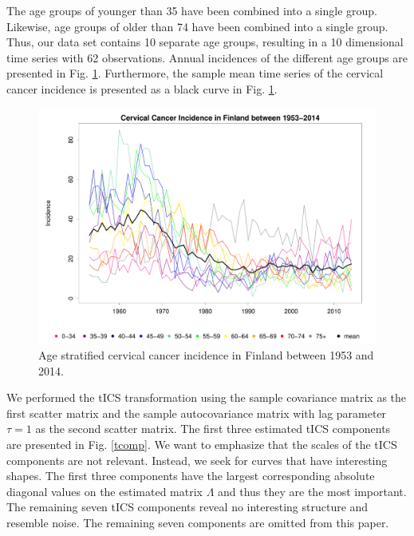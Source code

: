 \documentclass{llncs}
\begin{document}
 The age groups of younger than 35 have been combined  into a single group. Likewise, age groups of older than 74 have been combined into a single group. Thus, our data set contains 10 separate age groups, resulting in a 10 dimensional time series with 62 observations. Annual incidences of the different age groups  are  presented in Fig. \ref{p1b}. Furthermore, the sample mean time series of the cervical cancer incidence is presented as a black curve in Fig. \ref{p1b}.
\begin{figure}
   \centering
\includegraphics[width=1\linewidth]{cervicaloriginal.pdf}
\caption{Age stratified cervical cancer incidence in Finland between 1953 and 2014.}
\label{p1b}
\end{figure}

We performed the tICS transformation using the sample covariance matrix as the first scatter matrix and the sample autocovariance matrix with lag parameter $\tau=1$ as the second scatter matrix. 
The first three estimated tICS components are presented in Fig. \ref{tcomp}. We want to emphasize that the scales of the tICS components are not relevant. Instead, we seek for curves that have interesting shapes. The first three components have the largest corresponding absolute diagonal values on the estimated matrix $\Lambda$ and thus they are the most important. The remaining seven tICS components reveal no interesting structure and resemble noise. The remaining seven components are omitted from this paper.

 
\end{document}
